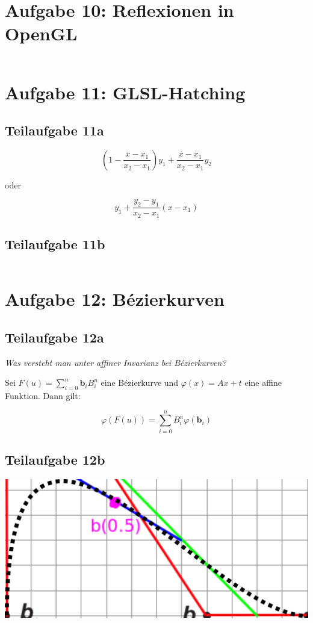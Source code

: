 \documentclass[a4paper]{scrartcl}
\begin{document}
\section*{Aufgabe 10: Reflexionen in OpenGL}
\inputminted[linenos, numbersep=5pt, tabsize=4, frame=lines, label=shader.frag]{glsl}{shader.frag}

\section*{Aufgabe 11: GLSL-Hatching}
\subsection*{Teilaufgabe 11a}

\[
	\left(1 - \frac{x - x_1}{x_2 - x_1}\right) y_1 + \frac{x - x_1}{x_2 - x_1} y_2
\]

oder

\[
	y_1 + \frac{y_2 - y_1}{x_2 - x_1} (x - x_1)
\]

\clearpage
\subsection*{Teilaufgabe 11b}
\inputminted[linenos, numbersep=5pt, tabsize=4, frame=lines, label=shader.frag]{glsl}{hatching.frag}

\clearpage
\section*{Aufgabe 12: Bézierkurven}
\subsection*{Teilaufgabe 12a}
\textit{Was versteht man unter affiner Invarianz bei Bézierkurven?}

Sei $F(u) = \sum_{i=0}^n \mathbf{b}_i B_i^n$ eine Bézierkurve und
$\varphi(x) = A x + t$ eine affine Funktion. Dann gilt:

\[\varphi(F(u)) = \sum_{i=0}^n B_i^n \varphi(\mathbf{b}_i)\]

\subsection*{Teilaufgabe 12b}
\includegraphics*[width=\linewidth, keepaspectratio]{12b.png}
\end{document}
